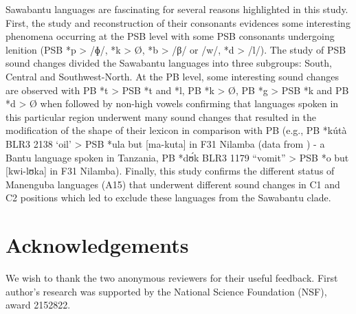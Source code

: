 \documentclass[output=paper,colorlinks,citecolor=brown
]{langscibook}
\begin{document}
Sawabantu languages are fascinating for several reasons highlighted in this study. First, the study and reconstruction of their consonants evidences some interesting phenomena occurring at the PSB level with some PSB consonants undergoing lenition (PSB *p > /ɸ/, *k > Ø, *b > /β/ or /w/, *d > /l/). The study of PSB sound changes divided the Sawabantu languages into three subgroups: South, Central and Southwest-North. At the PB level, some interesting sound changes are observed with PB *t > PSB *t and *l, PB *k > Ø, PB *g > PSB *k and PB *d > Ø when followed by non-high vowels confirming that languages spoken in this particular region underwent many sound changes that resulted in the modification of the shape of their lexicon in comparison with PB (e.g., PB *kútà BLR3 2138 `oil' > PSB *ula but [ma-kuta] in F31 Nilamba (data from \citealt{yukawa1989}) - a Bantu language spoken in Tanzania, PB *dʊ́k BLR3 1179 “vomit” > PSB *o but [kwi-lʊka] in F31 Nilamba). Finally, this study confirms the different status of Manenguba languages (A15) that underwent different sound changes in C1 and C2 positions which led \citet{nurseandphilippson2003} to exclude these languages from the Sawabantu clade. 

\section*{Acknowledgements}

We wish to thank the two anonymous reviewers for their useful feedback. First author’s research was supported by the National Science Foundation (NSF), award 2152822.

\sloppy %

\printbibliography[heading=subbibliography,notkeyword=this]
\end{document}
